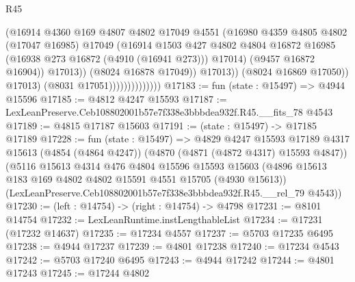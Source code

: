 \begin{lexlean}{R45}
\begin{coremodule}
                                          (@16914
                                            @4360
                                            @169
                                            @4807
                                            @4802
                                            @17049
                                            @4551
                                            (@16980
                                              @4359
                                              @4805
                                              @4802
                                              (@17047 @16985)
                                              @17049
                                              (@16914
                                                @1503
                                                @427
                                                @4802
                                                @4804
                                                @16872
                                                @16985
                                                (@16938 @273 @16872 (@4910 (@16941 @273)))
                                                @17014)
                                              (@9457 @16872 @16904))
                                            @17013))
                                        (@8024 @16878 @17049))
                                      @17013))
                                  (@8024 @16869 @17050))
                                @17013)
                              (@8031 @17051))))))))))))))
@17183 := fun (state : @15497) => @4944 @15596
@17185 := @4812 @4247 @15593
@17187 := LexLeanPreserve.Ceb108802001b57e7f338e3bbbdea932f.R45.__fits_78 @4543
@17189 := @4815 @17187 @15603
@17191 := (state : @15497) -> @17185 @17189
@17228 := fun (state : @15497) =>
  @4829
    @4247
    @15593
    @17189
    @4317
    @15613
    (@4854 (@4864 @4247))
    (@4870 (@4871 (@4872 @4317) @15593 @4847))
    (@5116
      @15613
      @4314
      @476
      @4804
      @15596
      @15593
      @15603
      (@4896 @15613 @183 @169 @4802 @4802 @15591 @4551 @15705 (@4930 @15613))
      (LexLeanPreserve.Ceb108802001b57e7f338e3bbbdea932f.R45.__rel_79 @4543))
@17230 := (left : @14754) -> (right : @14754) -> @4798
@17231 := @8101 @14754
@17232 := LexLeanRuntime.instLengthableList
@17234 := @17231 (@17232 @14637)
@17235 := @17234 @4557
@17237 := @5703 @17235 @6495
@17238 := @4944 @17237
@17239 := @4801 @17238
@17240 := @17234 @4543
@17242 := @5703 @17240 @6495
@17243 := @4944 @17242
@17244 := @4801 @17243
@17245 := @17244 @4802

\end{coremodule}
\end{lexlean}
